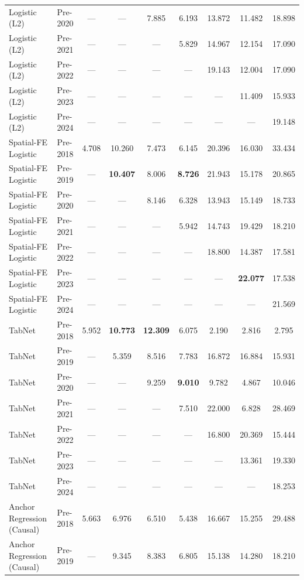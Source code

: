 \begin{table}[htbp]
{\begin{tabular}{l lccccccc}
Logistic (L2) & Pre-2020 & --- & --- & 7.885 & 6.193 & 13.872 & 11.482 & 18.898 \\
Logistic (L2) & Pre-2021 & --- & --- & --- & 5.829 & 14.967 & 12.154 & 17.090 \\
Logistic (L2) & Pre-2022 & --- & --- & --- & --- & 19.143 & 12.004 & 17.090 \\
Logistic (L2) & Pre-2023 & --- & --- & --- & --- & --- & 11.409 & 15.933 \\
Logistic (L2) & Pre-2024 & --- & --- & --- & --- & --- & --- & 19.148 \\
Spatial-FE Logistic & Pre-2018 & 4.708 & 10.260 & 7.473 & 6.145 & 20.396 & 16.030 & 33.434 \\
Spatial-FE Logistic & Pre-2019 & --- & \textbf{10.407} & 8.006 & \textbf{8.726} & 21.943 & 15.178 & 20.865 \\
Spatial-FE Logistic & Pre-2020 & --- & --- & 8.146 & 6.328 & 13.943 & 15.149 & 18.733 \\
Spatial-FE Logistic & Pre-2021 & --- & --- & --- & 5.942 & 14.743 & 19.429 & 18.210 \\
Spatial-FE Logistic & Pre-2022 & --- & --- & --- & --- & 18.800 & 14.387 & 17.581 \\
Spatial-FE Logistic & Pre-2023 & --- & --- & --- & --- & --- & \textbf{22.077} & 17.538 \\
Spatial-FE Logistic & Pre-2024 & --- & --- & --- & --- & --- & --- & 21.569 \\
TabNet & Pre-2018 & 5.952 & \textbf{10.773} & \textbf{12.309} & 6.075 & 2.190 & 2.816 & 2.795 \\
TabNet & Pre-2019 & --- & 5.359 & 8.516 & 7.783 & 16.872 & 16.884 & 15.931 \\
TabNet & Pre-2020 & --- & --- & 9.259 & \textbf{9.010} & 9.782 & 4.867 & 10.046 \\
TabNet & Pre-2021 & --- & --- & --- & 7.510 & 22.000 & 6.828 & 28.469 \\
TabNet & Pre-2022 & --- & --- & --- & --- & 16.800 & 20.369 & 15.444 \\
TabNet & Pre-2023 & --- & --- & --- & --- & --- & 13.361 & 19.330 \\
TabNet & Pre-2024 & --- & --- & --- & --- & --- & --- & 18.253 \\
Anchor Regression (Causal) & Pre-2018 & 5.663 & 6.976 & 6.510 & 5.438 & 16.667 & 15.255 & 29.488 \\
Anchor Regression (Causal) & Pre-2019 & --- & 9.345 & 8.383 & 6.805 & 15.138 & 14.280 & 18.210 \\

\end{tabular}}
\end{table}
